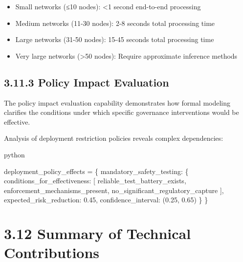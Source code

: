 \documentclass[
  11pt,
  letterpaper,
]{book}
\newenvironment{Shaded}{\begin{snugshade}}{\end{snugshade}}
\newcommand{\FloatTok}[1]{\textcolor[rgb]{0.68,0.00,0.00}{#1}}
\newcommand{\NormalTok}[1]{\textcolor[rgb]{0.00,0.23,0.31}{#1}}
\newcommand{\OperatorTok}[1]{\textcolor[rgb]{0.37,0.37,0.37}{#1}}
\newcommand{\StringTok}[1]{\textcolor[rgb]{0.13,0.47,0.30}{#1}}
\providecommand{\tightlist}{%
  \setlength{\itemsep}{0pt}\setlength{\parskip}{0pt}}
\begin{document}
\begin{itemize}
\tightlist
\item
  Small networks (≤10 nodes): \textless1 second end-to-end processing
\item
  Medium networks (11-30 nodes): 2-8 seconds total processing time
\item
  Large networks (31-50 nodes): 15-45 seconds total processing time
\item
  Very large networks (\textgreater50 nodes): Require approximate
  inference methods
\end{itemize}

\subsection*{3.11.3 Policy Impact Evaluation}\label{sec-policy-impact}

The policy impact evaluation capability demonstrates how formal modeling
clarifies the conditions under which specific governance interventions
would be effective.

Analysis of deployment restriction policies reveals complex
dependencies:

python

\begin{Shaded}
\begin{Highlighting}[]
\NormalTok{deployment\_policy\_effects }\OperatorTok{=}\NormalTok{ \{}
    \StringTok{\textquotesingle{}mandatory\_safety\_testing\textquotesingle{}}\NormalTok{: \{}
        \StringTok{\textquotesingle{}conditions\_for\_effectiveness\textquotesingle{}}\NormalTok{: [}
            \StringTok{\textquotesingle{}reliable\_test\_battery\_exists\textquotesingle{}}\NormalTok{,}
            \StringTok{\textquotesingle{}enforcement\_mechanisms\_present\textquotesingle{}}\NormalTok{,}
            \StringTok{\textquotesingle{}no\_significant\_regulatory\_capture\textquotesingle{}}
\NormalTok{        ],}
        \StringTok{\textquotesingle{}expected\_risk\_reduction\textquotesingle{}}\NormalTok{: }\FloatTok{0.45}\NormalTok{,}
        \StringTok{\textquotesingle{}confidence\_interval\textquotesingle{}}\NormalTok{: (}\FloatTok{0.25}\NormalTok{, }\FloatTok{0.65}\NormalTok{)}
\NormalTok{    \}}
\NormalTok{\}}
\end{Highlighting}
\end{Shaded}

\section*{3.12 Summary of Technical
Contributions}\label{sec-technical-summary}
\end{document}
